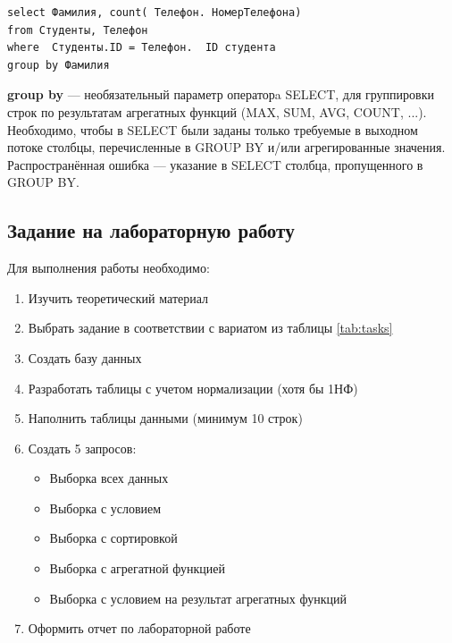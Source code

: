 \documentclass[a4paper]{article}
\begin{document}
\begin{lstlisting}[label=group, caption=Запрос количества телефонов у студентов]
select Фамилия, count( Телефон. НомерТелефона)
from Студенты, Телефон
where  Студенты.ID = Телефон.  ID студента
group by Фамилия
\end{lstlisting}

\textbf{group by} --- необязательный параметр операторa SELECT, для группировки строк по результатам агрегатных функций (MAX, SUM, AVG, COUNT, ...). Необходимо, чтобы в SELECT были заданы только требуемые в выходном потоке столбцы, перечисленные в GROUP BY и/или агрегированные значения. Распространённая ошибка — указание в SELECT столбца, пропущенного в GROUP BY.

\newpage
\subsection{Задание на лабораторную работу}

Для выполнения работы необходимо:
\begin{enumerate}
  \item Изучить теоретический материал
  \item Выбрать задание в соответствии с вариатом из таблицы \ref{tab:tasks}
  \item Создать базу данных
  \item Разработать таблицы с учетом нормализации (хотя бы 1НФ)
  \item Наполнить таблицы данными (минимум 10 строк)
  \item Создать 5 запросов:
    \begin{itemize}
      \item Выборка всех данных
      \item Выборка с условием
      \item Выборка с сортировкой
      \item Выборка с агрегатной функцией
      \item Выборка с условием на результат агрегатных функций
    \end{itemize}
  \item Оформить отчет по лабораторной работе
\end{enumerate}
\end{document}

